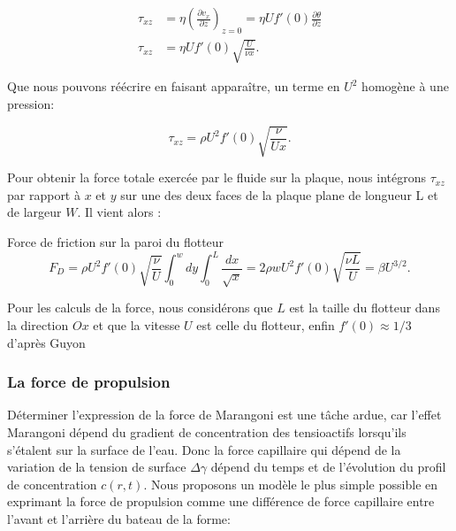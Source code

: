 \documentclass[french, 10pt]{article}
\begin{document}
\begin{equation}
  \begin{aligned}
    \tau_{xz} &= \eta\left(\frac{\partial v_x}{\partial z}\right)_{z=0}=\eta U f'(0)\frac{\partial \theta}{\partial z}\\
    \tau_{xz} &=\eta U f'(0)\sqrt{\frac{U}{\nu x}}.
  \end{aligned}
\end{equation}

Que nous pouvons réécrire en faisant apparaître, un terme en $U^2$ homogène à une pression:

\begin{equation}
  \tau_{xz} = \rho U^2 f'(0)\sqrt{\frac{\nu}{U x}}.
\end{equation}

Pour obtenir la force totale exercée par le fluide sur la plaque, nous intégrons $\tau_{xz}$ par rapport à $x$ et $y$ sur une des deux faces de la plaque plane de longueur L et de largeur $W$. Il vient alors :

\begin{Programme}{Force de friction sur la paroi du flotteur}
  \begin{equation}
    F_{D} = \rho U^2f'(0)\sqrt{\frac{\nu}{U}}\displaystyle\int_{0}^{w}dy\int_{0}^{L}\frac{dx}{\sqrt{x}}=2\rho w U^2f'(0)\sqrt{\frac{\nu L}{U}} = \beta U^{3/2}.\label{eq:FrottementdePeau}
  \end{equation}

   Pour les calculs de la force, nous considérons que $L$ est la taille du flotteur dans la direction $Ox$ et que la vitesse $U$ est celle du flotteur, enfin $f'(0) \approx 1/3$ d'après Guyon
\end{Programme}


\subsubsection{La force de propulsion}

 Déterminer l'expression de la force de Marangoni est une tâche ardue, car l'effet Marangoni dépend du gradient de concentration des tensioactifs lorsqu'ils s'étalent sur la surface de l'eau. Donc la force capillaire qui dépend de la variation de la tension de surface $\Delta\gamma$ dépend du temps et de l'évolution du profil de concentration $c(r,t)$. Nous proposons un modèle le plus simple possible en exprimant la force de propulsion comme une différence de force capillaire entre l'avant et l'arrière du bateau de la forme:
\end{document}
